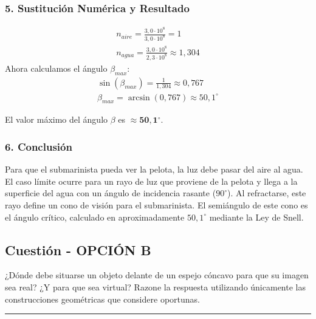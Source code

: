 \subsubsection*{5. Sustitución Numérica y Resultado}
\begin{gather}
    n_{aire} = \frac{3,0 \cdot 10^8}{3,0 \cdot 10^8} = 1 \\
    n_{agua} = \frac{3,0 \cdot 10^8}{2,3 \cdot 10^8} \approx 1,304
\end{gather}
Ahora calculamos el ángulo $\beta_{max}$:
\begin{gather}
    \sin(\beta_{max}) = \frac{1}{1,304} \approx 0,767 \\
    \beta_{max} = \arcsin(0,767) \approx 50,1^\circ
\end{gather}
\begin{cajaresultado}
    El valor máximo del ángulo $\beta$ es $\boldsymbol{\approx 50,1^\circ}$.
\end{cajaresultado}

\subsubsection*{6. Conclusión}
\begin{cajaconclusion}
Para que el submarinista pueda ver la pelota, la luz debe pasar del aire al agua. El caso límite ocurre para un rayo de luz que proviene de la pelota y llega a la superficie del agua con un ángulo de incidencia rasante ($90^\circ$). Al refractarse, este rayo define un cono de visión para el submarinista. El semiángulo de este cono es el ángulo crítico, calculado en aproximadamente $50,1^\circ$ mediante la Ley de Snell.
\end{cajaconclusion}

\newpage

\subsection{Cuestión - OPCIÓN B}
\label{subsec:3B_2011_sep_ext}

\begin{cajaenunciado}
¿Dónde debe situarse un objeto delante de un espejo cóncavo para que su imagen sea real? ¿Y para que sea virtual? Razone la respuesta utilizando únicamente las construcciones geométricas que considere oportunas.
\end{cajaenunciado}
\hrule

